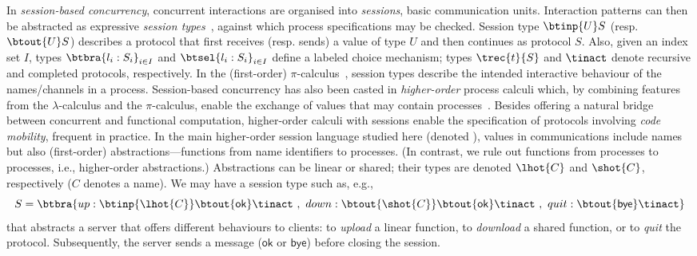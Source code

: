 In \emph{session-based concurrency}, concurrent interactions are organised into \emph{sessions}, basic communication units.
Interaction patterns can then be abstracted as expressive \emph{session types}~\cite{honda.vasconcelos.kubo:language-primitives}, against which process specifications may be checked. 
Session type $\btinp{U} S$ (resp.  $\btout{U} S$)
describes a protocol that first receives (resp. sends) a value of type $U$ and then continues as protocol $S$.
Also, given an index set $I$, types $\btbra{l_i:S_i}_{i \in I}$ 
and $\btsel{l_i:S_i}_{i \in I}$ 
define %
 a labeled choice mechanism; types 
$\trec{t}{S}$ 
and 
$\tinact$ denote recursive and completed protocols, respectively.
In the (first-order) $\pi$-calculus~\cite{MilnerR:calmp1}, 
session types describe the intended interactive behaviour of the names/channels in a process.
Session-based concurrency has also been casted in \emph{higher-order} process
calculi which, by combining features from the $\lambda$-calculus and the $\pi$-calculus, 
enable the exchange of values that may contain processes~\cite{tlca07,DBLP:journals/jfp/GayV10}. 
Besides offering a natural bridge between concurrent and functional computation, 
higher-order calculi with sessions enable the specification of protocols involving \emph{code mobility}, 
frequent in practice.
In the main higher-order session language  studied here (denoted \HOp),
 values in communications include names but also (first-order) abstractions---functions from name identifiers to processes. 
 (In contrast, we rule out functions from processes to processes, i.e., higher-order abstractions.)
Abstractions can be linear or shared; their types are  denoted $\lhot{C}$ and $\shot{C}$, respectively ($C$ 
denotes a name). We may have a 
session type such as, e.g.,
$$S = \btbra{up:\btinp{\lhot{C}}\btout{\mathsf{ok}}\tinact ~ , ~ down:\btout{\shot{C}}\btout{\mathsf{ok}}\tinact ~ , ~quit:\btout{\mathsf{bye}}\tinact}_{}$$
that abstracts a server that offers different behaviours to clients: 
  to \emph{upload} a linear function, %
  to \emph{download} a shared function, %
   or to \emph{quit} the protocol. Subsequently, 
  the server sends a message ($\mathsf{ok}$ or $\mathsf{bye}$) before closing the session.





